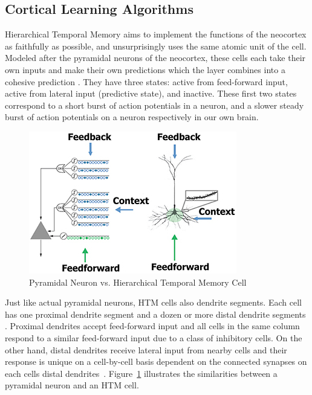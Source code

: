 \documentclass[oneside,12pt,openany]{book}
\begin{document}
	\subsection{Cortical Learning Algorithms}
	
	Hierarchical Temporal Memory aims to implement the functions of the neocortex as faithfully as possible, and unsurprisingly uses the same atomic unit of the cell. Modeled after the pyramidal neurons of the neocortex, these cells each take their own inputs and make their own predictions which the layer combines into a cohesive prediction \cite{Whitepaper}. They have three states: active from feed-forward input, active from lateral input (predictive state), and inactive. These first two states correspond to a short burst of action potentials in a neuron, and a slower steady burst of action potentials on a neuron respectively in our own brain.
	
	\begin{figure}[!ht]
		\centering
		\includegraphics[width=.7\linewidth]{images/HTMCell.jpg}
		\caption[Pyramidal Neuron vs. Hierarchical Temporal Memory Cell]{Pyramidal Neuron vs. Hierarchical Temporal Memory Cell~\cite{TheHTMSpatialPooler}}
		\label{fig:HTMCell}
	\end{figure}

	Just like actual pyramidal neurons, HTM cells also dendrite segments. Each cell has one proximal dendrite segment and a dozen or more distal dendrite segments \cite {Whitepaper}. Proximal dendrites accept feed-forward input and all cells in the same column respond to a similar feed-forward input due to a class of inhibitory cells. On the other hand, distal dendrites receive lateral input from nearby cells and their response is unique on a cell-by-cell basis dependent on the connected synapses on each cells distal dendrites~\cite{Whitepaper}. Figure~\ref{fig:HTMCell} illustrates the similarities between a pyramidal neuron and an HTM cell.
	
\end{document}
